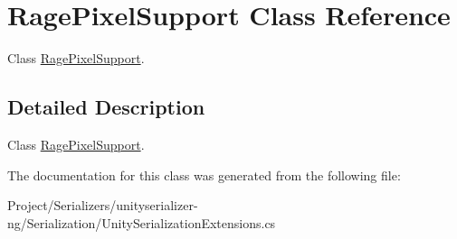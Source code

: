 \hypertarget{class_rage_pixel_support}{}\section{Rage\+Pixel\+Support Class Reference}
\label{class_rage_pixel_support}


Class \hyperlink{class_rage_pixel_support}{Rage\+Pixel\+Support}.  




\subsection{Detailed Description}
Class \hyperlink{class_rage_pixel_support}{Rage\+Pixel\+Support}. 



The documentation for this class was generated from the following file\+:\begin{DoxyCompactItemize}
\item 
Project/\+Serializers/unityserializer-\/ng/\+Serialization/Unity\+Serialization\+Extensions.\+cs\end{DoxyCompactItemize}

